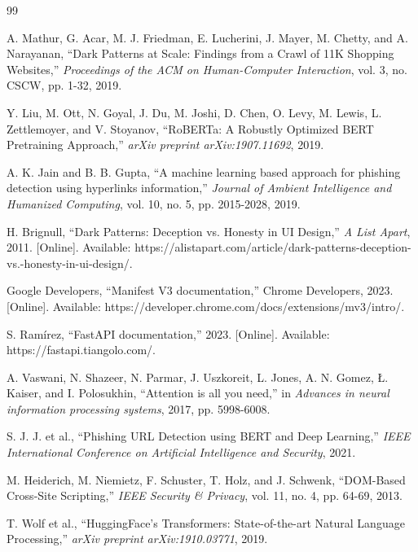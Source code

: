 \documentclass[12pt,a4paper]{report}
\begin{document}
\begin{thebibliography}{99}

A. Mathur, G. Acar, M. J. Friedman, E. Lucherini, J. Mayer, M. Chetty, and A. Narayanan, ``Dark Patterns at Scale: Findings from a Crawl of 11K Shopping Websites,'' \textit{Proceedings of the ACM on Human-Computer Interaction}, vol. 3, no. CSCW, pp. 1-32, 2019.

Y. Liu, M. Ott, N. Goyal, J. Du, M. Joshi, D. Chen, O. Levy, M. Lewis, L. Zettlemoyer, and V. Stoyanov, ``RoBERTa: A Robustly Optimized BERT Pretraining Approach,'' \textit{arXiv preprint arXiv:1907.11692}, 2019.

A. K. Jain and B. B. Gupta, ``A machine learning based approach for phishing detection using hyperlinks information,'' \textit{Journal of Ambient Intelligence and Humanized Computing}, vol. 10, no. 5, pp. 2015-2028, 2019.

H. Brignull, ``Dark Patterns: Deception vs. Honesty in UI Design,'' \textit{A List Apart}, 2011. [Online]. Available: https://alistapart.com/article/dark-patterns-deception-vs.-honesty-in-ui-design/.

Google Developers, ``Manifest V3 documentation,'' Chrome Developers, 2023. [Online]. Available: https://developer.chrome.com/docs/extensions/mv3/intro/.

S. Ramírez, ``FastAPI documentation,'' 2023. [Online]. Available: https://fastapi.tiangolo.com/.

A. Vaswani, N. Shazeer, N. Parmar, J. Uszkoreit, L. Jones, A. N. Gomez, Ł. Kaiser, and I. Polosukhin, ``Attention is all you need,'' in \textit{Advances in neural information processing systems}, 2017, pp. 5998-6008.

S. J. J. et al., ``Phishing URL Detection using BERT and Deep Learning,'' \textit{IEEE International Conference on Artificial Intelligence and Security}, 2021.

M. Heiderich, M. Niemietz, F. Schuster, T. Holz, and J. Schwenk, ``DOM-Based Cross-Site Scripting,'' \textit{IEEE Security \& Privacy}, vol. 11, no. 4, pp. 64-69, 2013.

T. Wolf et al., ``HuggingFace's Transformers: State-of-the-art Natural Language Processing,'' \textit{arXiv preprint arXiv:1910.03771}, 2019.

\end{thebibliography}
\end{document}
